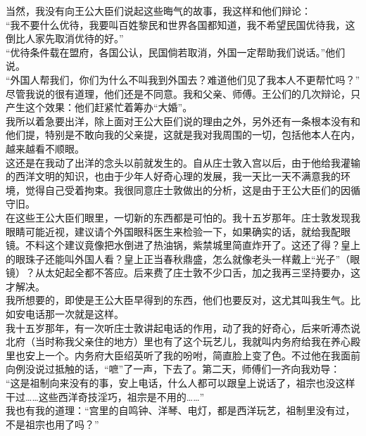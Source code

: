 当然，我没有向王公大臣们说起这些晦气的故事，我这样和他们辩论：\\

“我不要什么优待，我要叫百姓黎民和世界各国都知道，我不希望民国优待我，这倒比人家先取消优待的好。”\\

“优待条件载在盟府，各国公认，民国倘若取消，外国一定帮助我们说话。”他们说。\\

“外国人帮我们，你们为什么不叫我到外国去？难道他们见了我本人不更帮忙吗？”\\

尽管我说的很有道理，他们还是不同意。我和父亲、师傅。王公们的几次辩论，只产生这个效果：他们赶紧忙着筹办“大婚”。\\

我所以着急要出洋，除上面对王公大臣们说的理由之外，另外还有一条根本没有和他们提，特别是不敢向我的父亲提，这就是我对我周围的一切，包括他本人在内，越来越看不顺眼。\\

这还是在我动了出洋的念头以前就发生的。自从庄士敦入宫以后，由于他给我灌输的西洋文明的知识，也由于少年人好奇心理的发展，我一天比一天不满意我的环境，觉得自己受着拘束。我很同意庄士敦做出的分析，这是由于王公大臣们的因循守旧。\\

在这些王公大臣们眼里，一切新的东西都是可怕的。我十五岁那年。庄士敦发现我眼睛可能近视，建议请个外国眼科医生来检验一下，如果确实的话，就给我配眼镜。不料这个建议竟像把水倒进了热油锅，紫禁城里简直炸开了。这还了得？皇上的眼珠子还能叫外国人看？皇上正当春秋鼎盛，怎么就像老头一样戴上“光子”（眼镜）？从太妃起全都不答应。后来费了庄士敦不少口舌，加之我再三坚持要办，这才解决。\\

我所想要的，即使是王公大臣早得到的东西，他们也要反对，这尤其叫我生气。比如安电话那一次就是这样。\\

我十五岁那年，有一次听庄士敦讲起电话的作用，动了我的好奇心，后来听溥杰说北府（当时称我父亲住的地方）里也有了这个玩艺儿，我就叫内务府给我在养心殿里也安上一个。内务府大臣绍英听了我的吩咐，简直脸上变了色。不过他在我面前向例没说过抵触的话，“嗻”了一声，下去了。第二天，师傅们一齐向我劝导：\\

“这是祖制向来没有的事，安上电话，什么人都可以跟皇上说话了，祖宗也没这样干过……这些西洋奇技淫巧，祖宗是不用的……”\\

我也有我的道理：“宫里的自鸣钟、洋琴、电灯，都是西洋玩艺，祖制里没有过，不是祖宗也用了吗？”\\

